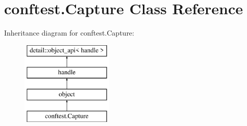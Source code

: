 \hypertarget{classconftest_1_1_capture}{}\section{conftest.\+Capture Class Reference}
\label{classconftest_1_1_capture}
Inheritance diagram for conftest.\+Capture\+:\begin{figure}[H]
\begin{center}
\leavevmode
\includegraphics[height=4.000000cm]{classconftest_1_1_capture}
\end{center}
\end{figure}
